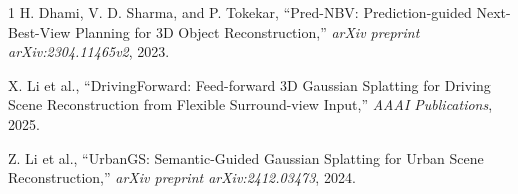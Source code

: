 \documentclass[12pt,a4paper]{article}
\begin{document}
\begin{thebibliography}{1}
		H. Dhami, V. D. Sharma, and P. Tokekar, ``Pred-NBV: Prediction-guided Next-Best-View Planning for 3D Object Reconstruction,'' \textit{arXiv preprint arXiv:2304.11465v2}, 2023.
		
		X. Li et al., ``DrivingForward: Feed-forward 3D Gaussian Splatting for Driving Scene Reconstruction from Flexible Surround-view Input,'' \textit{AAAI Publications}, 2025.
		
		Z. Li et al., ``UrbanGS: Semantic-Guided Gaussian Splatting for Urban Scene Reconstruction,'' \textit{arXiv preprint arXiv:2412.03473}, 2024.
		
	\end{thebibliography}
	
\end{document}
